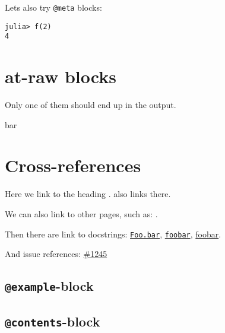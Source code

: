 Let{\textquotesingle}s also try \texttt{@meta} blocks:






\begin{verbatim}
julia> f(2)
4
\end{verbatim}





\section{at-raw blocks}



\label{14134642751930898430}{}


Only one of them should end up in the output.






bar



\section{Cross-references}



\label{12734752257024730942}{}


Here we link to the heading .  also links there.



We can also link to other pages, such as: .



Then there are link to docstrings: \href{@ref}{\texttt{Foo.bar}}, \href{@ref Foo.bar}{\texttt{foobar}}, \href{@ref Foo.bar}{foobar}.



And issue references: \href{https://example.org/Repository.jl/blob/1245}{\#1245}



\subsection{\texttt{@example}-block}



\label{12317204655950454097}{}


\subsection{\texttt{@contents}-block}



